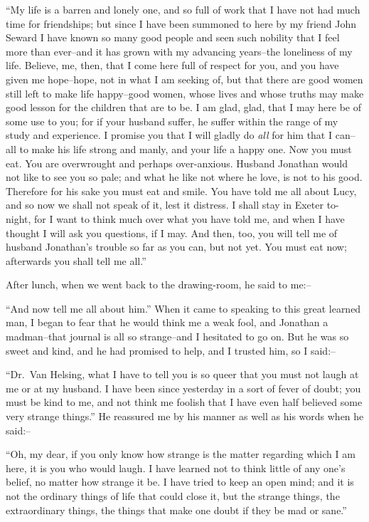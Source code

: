 \documentclass[12pt,openright]{book}
\begin{document}
“My life is a barren and lonely one, and so full of work that I have not had much time for friendships; but since I have been summoned to here by my friend John Seward I have known so many good people and seen such nobility that I feel more than ever–and it has grown with my advancing years–the loneliness of my life. Believe, me, then, that I come here full of respect for you, and you have given me hope–hope, not in what I am seeking of, but that there are good women still left to make life happy–good women, whose lives and whose truths may make good lesson for the children that are to be. I am glad, glad, that I may here be of some use to you; for if your husband suffer, he suffer within the range of my study and experience. I promise you that I will gladly do \textit{all} for him that I can–all to make his life strong and manly, and your life a happy one. Now you must eat. You are overwrought and perhaps over-anxious. Husband Jonathan would not like to see you so pale; and what he like not where he love, is not to his good. Therefore for his sake you must eat and smile. You have told me all about Lucy, and so now we shall not speak of it, lest it distress. I shall stay in Exeter to-night, for I want to think much over what you have told me, and when I have thought I will ask you questions, if I may. And then, too, you will tell me of husband Jonathan’s trouble so far as you can, but not yet. You must eat now; afterwards you shall tell me all.”

After lunch, when we went back to the drawing-room, he said to me:–

“And now tell me all about him.” When it came to speaking to this great learned man, I began to fear that he would think me a weak fool, and Jonathan a madman–that journal is all so strange–and I hesitated to go on. But he was so sweet and kind, and he had promised to help, and I trusted him, so I said:–

“Dr. Van Helsing, what I have to tell you is so queer that you must not laugh at me or at my husband. I have been since yesterday in a sort of fever of doubt; you must be kind to me, and not think me foolish that I have even half believed some very strange things.” He reassured me by his manner as well as his words when he said:–

“Oh, my dear, if you only know how strange is the matter regarding which I am here, it is you who would laugh. I have learned not to think little of any one’s belief, no matter how strange it be. I have tried to keep an open mind; and it is not the ordinary things of life that could close it, but the strange things, the extraordinary things, the things that make one doubt if they be mad or sane.”
\end{document}

